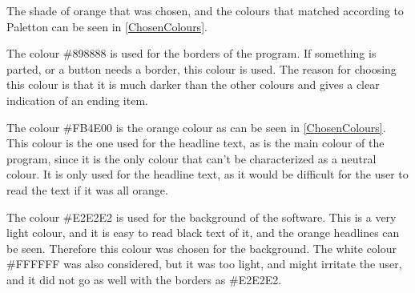 The shade of orange that was chosen, and the colours that matched according to Paletton can be seen in \cref{ChosenColours}.

The colour \#898888 is used for the borders of the program. If something is parted, or a button needs a border, this colour is used. The reason for choosing this colour is that it is much darker than the other colours and gives a clear indication of an ending item.

The colour \#FB4E00 is the orange colour as can be seen in \cref{ChosenColours}. This colour is the one used for the headline text, as is the main colour of the program, since it is the only colour that can't be characterized as a neutral colour. It is only used for the headline text, as it would be difficult for the user to read the text if it was all orange.

The colour \#E2E2E2 is used for the background of the software. This is a very light colour, and it is easy to read black text of it, and the orange headlines can be seen. Therefore this colour was chosen for the background. The white colour \#FFFFFF was also considered, but it was too light, and might irritate the user, and it did not go as well with the borders as \#E2E2E2.

